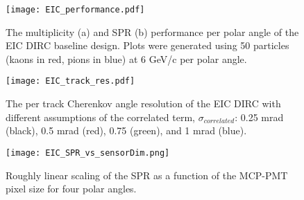 \begin{figure}[!htb]
	\centering
	\texttt{[image: EIC\_performance.pdf]}
	\caption{The multiplicity (a) and SPR (b) performance per polar angle of the EIC DIRC baseline design. Plots were generated using 50 particles (kaons in red, pions in blue) at 6 GeV/c per polar angle.}
	\label{fig:EIC_performance}
\end{figure}

\begin{figure}[!htb]
	\centering
	\texttt{[image: EIC\_track\_res.pdf]}
	\caption{The per track Cherenkov angle resolution of the EIC DIRC with different assumptions of the correlated term, $\sigma_{correlated}$: 0.25 mrad (black), 0.5 mrad (red), 0.75 (green), and 1 mrad (blue).}
	\label{fig:EIC_track_res}
\end{figure}

\begin{figure}[!htb]
	\centering
	\texttt{[image: EIC\_SPR\_vs\_sensorDim.png]}
	\caption{Roughly linear scaling of the SPR as a function of the MCP-PMT pixel size for four polar angles.}
	\label{fig:EIC_sensor_scaling}
\end{figure}


